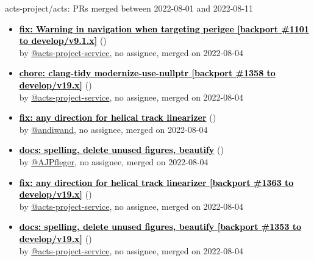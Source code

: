 \begin{frame}[allowframebreaks]{ acts-project/acts: PRs merged 
between 2022-08-01 and 2022-08-11
}
\begin{itemize}
    \item\prmerged\textbf{\href{https://github.com/acts-project/acts/pull/1368}{\textcolor{black}{fix: Warning in navigation when targeting perigee [backport \#1101 to develop/v9.1.x]}}}
    (\href{https://github.com/acts-project/acts/pull/1368}{}) \\
    by \href{https://github.com/acts-project-service}{@acts-project-service}, {}no assignee, merged on 2022-08-04

    \item\prmerged\textbf{\href{https://github.com/acts-project/acts/pull/1376}{\textcolor{black}{chore: clang-tidy modernize-use-nullptr [backport \#1358 to develop/v19.x]}}}
    (\href{https://github.com/acts-project/acts/pull/1376}{}) \\
    by \href{https://github.com/acts-project-service}{@acts-project-service}, {}no assignee, merged on 2022-08-04

    \item\prmerged\textbf{\href{https://github.com/acts-project/acts/pull/1363}{\textcolor{black}{fix: any direction for helical track linearizer}}}
    (\href{https://github.com/acts-project/acts/pull/1363}{}) \\
    by \href{https://github.com/andiwand}{@andiwand}, {}no assignee, merged on 2022-08-04

    \item\prmerged\textbf{\href{https://github.com/acts-project/acts/pull/1353}{\textcolor{black}{docs: spelling, delete unused figures, beautify}}}
    (\href{https://github.com/acts-project/acts/pull/1353}{}) \\
    by \href{https://github.com/AJPfleger}{@AJPfleger}, {}no assignee, merged on 2022-08-04

    \item\prmerged\textbf{\href{https://github.com/acts-project/acts/pull/1377}{\textcolor{black}{fix: any direction for helical track linearizer [backport \#1363 to develop/v19.x]}}}
    (\href{https://github.com/acts-project/acts/pull/1377}{}) \\
    by \href{https://github.com/acts-project-service}{@acts-project-service}, {}no assignee, merged on 2022-08-04

    \item\prmerged\textbf{\href{https://github.com/acts-project/acts/pull/1379}{\textcolor{black}{docs: spelling, delete unused figures, beautify [backport \#1353 to develop/v19.x]}}}
    (\href{https://github.com/acts-project/acts/pull/1379}{}) \\
    by \href{https://github.com/acts-project-service}{@acts-project-service}, {}no assignee, merged on 2022-08-04


\end{itemize}
\end{frame}

